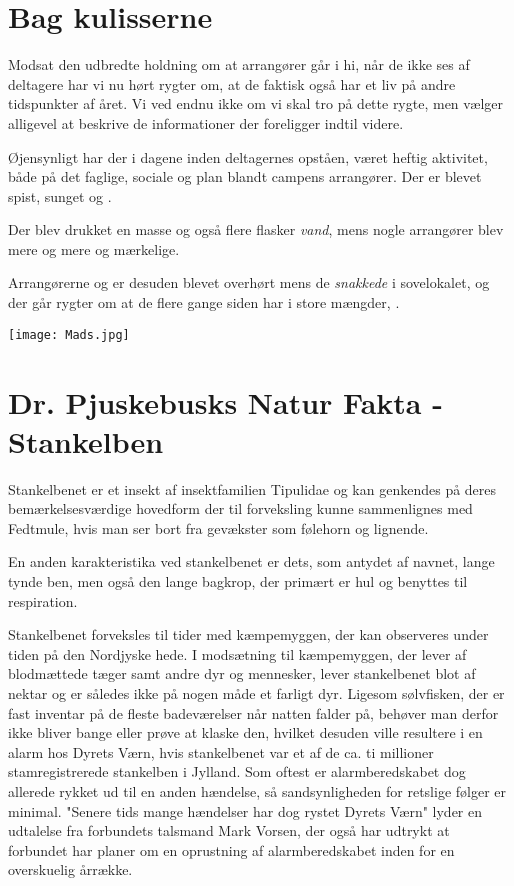 \begin{minipage}[t]{130mm}
\vspace{3mm}
\section*{Bag kulisserne}

Modsat den udbredte holdning om at arrangører går i hi, når de ikke ses af deltagere har vi nu hørt rygter om, at de faktisk også har et liv på andre tidspunkter af året. Vi ved endnu ikke om vi skal tro på dette rygte, men vælger alligevel at beskrive de informationer der foreligger indtil videre.

Øjensynligt har der i dagene inden deltagernes opståen, været heftig aktivitet, både på det faglige, sociale og  plan blandt campens arrangører. Der er blevet spist, sunget og .

Der blev drukket en masse  og også flere flasker \emph{vand}, mens nogle arrangører blev mere og mere  og mærkelige.

Arrangørerne  og  er desuden blevet overhørt mens de \emph{snakkede} i sovelokalet, og der går rygter om at de flere gange siden har   i store mængder,   . 

\texttt{[image: Mads.jpg]}

\section*{Dr. Pjuskebusks Natur Fakta - Stankelben}

Stankelbenet er et insekt af insektfamilien Tipulidae og kan genkendes på deres bemærkelsesværdige hovedform der til forveksling kunne sammenlignes med Fedtmule, hvis man ser bort fra gevækster som følehorn og lignende. 

En anden karakteristika ved stankelbenet er dets, som antydet af navnet, lange tynde ben, men også den lange bagkrop, der primært er hul og benyttes til respiration.

Stankelbenet forveksles til tider med kæmpemyggen, der kan observeres under tiden på den Nordjyske hede. I modsætning til kæmpemyggen, der lever af blodmættede tæger samt andre dyr og mennesker, lever stankelbenet blot af nektar og er således ikke på nogen måde et farligt dyr. Ligesom sølvfisken, der er fast inventar på de fleste badeværelser når natten falder på, behøver man derfor ikke bliver bange eller prøve at klaske den, hvilket desuden ville resultere i en alarm hos Dyrets Værn, hvis stankelbenet var et af de ca. ti millioner stamregistrerede stankelben i Jylland. Som oftest er alarmberedskabet dog allerede rykket ud til en anden hændelse, så sandsynligheden for retslige følger er minimal. "Senere tids mange hændelser har dog rystet Dyrets Værn" lyder en udtalelse fra forbundets talsmand Mark Vorsen, der også har udtrykt at forbundet har planer om en oprustning af alarmberedskabet inden for en overskuelig årrække.


\end{minipage}
